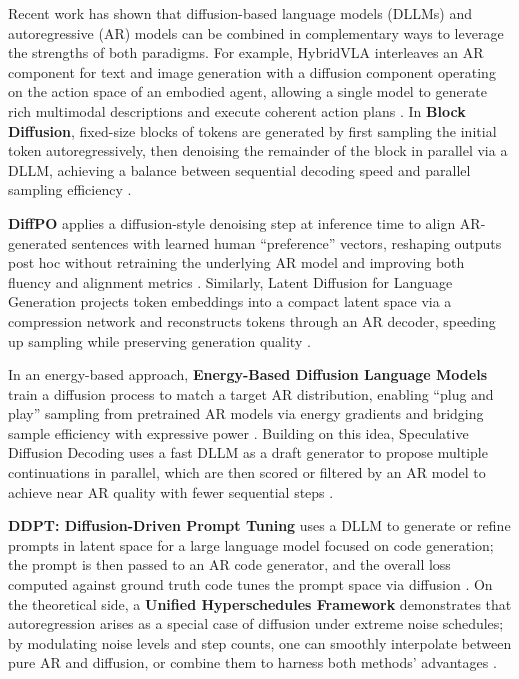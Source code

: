 Recent work has shown that diffusion-based language models (DLLMs) and autoregressive (AR) models can be combined in complementary ways to leverage the strengths of both paradigms. For example, HybridVLA interleaves an AR component for text and image generation with a diffusion component operating on the action space of an embodied agent, allowing a single model to generate rich multimodal descriptions and execute coherent action plans \cite{liu_hybridvla_2025}. In \textbf{Block Diffusion}, fixed-size blocks of tokens are generated by first sampling the initial token autoregressively, then denoising the remainder of the block in parallel via a DLLM, achieving a balance between sequential decoding speed and parallel sampling efficiency \cite{arriola_block_2025}.  

\noindent\textbf{DiffPO} applies a diffusion-style denoising step at inference time to align AR-generated sentences with learned human ``preference'' vectors, reshaping outputs post hoc without retraining the underlying AR model and improving both fluency and alignment metrics \cite{chen_diffpo_2025}. Similarly, Latent Diffusion for Language Generation projects token embeddings into a compact latent space via a compression network and reconstructs tokens through an AR decoder, speeding up sampling while preserving generation quality \cite{lovelace_latent_2023}.  

\noindent In an energy-based approach, \textbf{Energy-Based Diffusion Language Models} train a diffusion process to match a target AR distribution, enabling ``plug and play'' sampling from pretrained AR models via energy gradients and bridging sample efficiency with expressive power \cite{xu_energy-based_2025}. Building on this idea, Speculative Diffusion Decoding uses a fast DLLM as a draft generator to propose multiple continuations in parallel, which are then scored or filtered by an AR model to achieve near AR quality with fewer sequential steps \cite{christopher_speculative_2025}.  

\noindent \textbf{DDPT: Diffusion-Driven Prompt Tuning} uses a DLLM to generate or refine prompts in latent space for a large language model focused on code generation; the prompt is then passed to an AR code generator, and the overall loss computed against ground truth code tunes the prompt space via diffusion \cite{li_ddpt_2025}. On the theoretical side, a \textbf{Unified Hyperschedules Framework} demonstrates that autoregression arises as a special case of diffusion under extreme noise schedules; by modulating noise levels and step counts, one can smoothly interpolate between pure AR and diffusion, or combine them to harness both methods' advantages \cite{fathi_unifying_2025}.  

